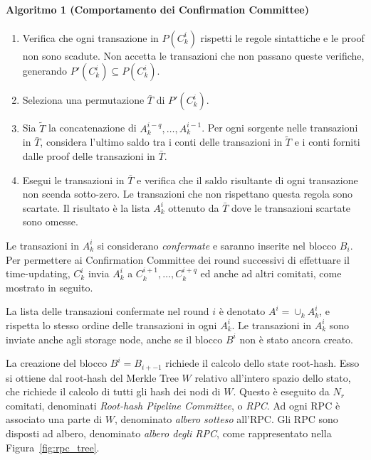 \paragraph*{Algoritmo 1 (Comportamento dei Confirmation Committee)}
\begin{enumerate}
	\item Verifica che ogni transazione in $P(C_k^i)$ rispetti le regole sintattiche e le proof non sono scadute. Non accetta le transazioni che non passano queste verifiche, generando $P'(C_k^i) \subseteq P(C_k^i)$.
	\item Seleziona una permutazione $\bar{T}$ di $P'(C_k^i)$.
	\item Sia $\widetilde{T}$ la concatenazione di $A_k^{i-q}, \dots, A_k^{i-1}$. Per ogni sorgente nelle transazioni in $\bar{T}$, considera l'ultimo saldo tra i conti delle transazioni in $\widetilde{T}$ e i conti forniti dalle proof delle transazioni in $\bar{T}$.
	\item Esegui le transazioni in $\bar{T}$ e verifica che il saldo risultante di ogni transazione non scenda sotto-zero. Le transazioni che non rispettano questa regola sono scartate. Il risultato è la lista $A_k^i$ ottenuto da $\bar{T}$ dove le transazioni scartate sono omesse.	
\end{enumerate}

Le transazioni in $A_k^i$ si considerano \emph{confermate} e saranno inserite nel blocco $B_i$. Per permettere ai Confirmation Committee dei round successivi di effettuare il time-updating, $C_k^i$ invia $A_k^i$ a $C_k^{i+1}, \dots, C_k^{i+q}$ ed anche ad altri comitati, come mostrato in seguito.

La lista delle transazioni confermate nel round $i$ è denotato $A^i = \cup_k A_k^i$, e rispetta lo stesso ordine delle transazioni in ogni $A_k^i$. Le transazioni in $A_k^i$ sono inviate anche agli storage node, anche se il blocco $B^i$ non è stato ancora creato.

La creazione del blocco $B^i = B_{i+-1}$ richiede il calcolo dello state root-hash. Esso si ottiene dal root-hash del Merkle Tree $W$ relativo all'intero spazio dello stato, che richiede il calcolo di tutti gli hash dei nodi di $W$.
Questo è eseguito da $N_r$ comitati, denominati \emph{Root-hash Pipeline Committee}, o \emph{RPC}. Ad ogni RPC è associato una parte di $W$, denominato \emph{albero sotteso} all'RPC. Gli RPC sono disposti ad albero, denominato \emph{albero degli RPC}, come rappresentato nella Figura~\ref{fig:rpc_tree}.

